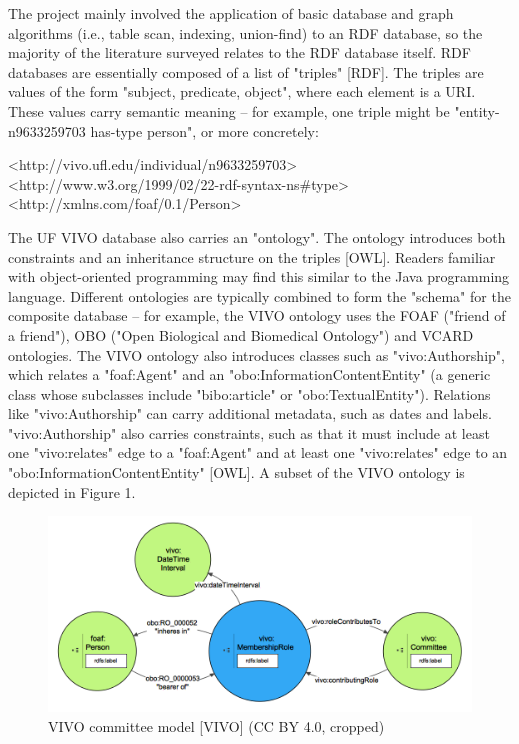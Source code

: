 \documentclass[11pt]{article}
\begin{document}
The project mainly involved the application of basic database and graph algorithms (i.e., table scan, indexing, union-find) to an RDF database, so the majority of the literature surveyed relates to the RDF database itself. RDF databases are essentially composed of a list of "triples" [RDF]. The triples are values of the form "subject, predicate, object", where each element is a URI. These values carry semantic meaning -- for example, one triple might be "entity-n9633259703 has-type person", or more concretely:

<http://vivo.ufl.edu/individual/n9633259703> <http://www.w3.org/1999/02/22-rdf-syntax-ns\#type> <http://xmlns.com/foaf/0.1/Person>

The UF VIVO database also carries an "ontology". The ontology introduces both constraints and an inheritance structure on the triples [OWL]. Readers familiar with object-oriented programming may find this similar to the Java programming language. Different ontologies are typically combined to form the "schema" for the composite database -- for example, the VIVO ontology uses the FOAF ("friend of a friend"), OBO ("Open Biological and Biomedical Ontology") and VCARD ontologies. The VIVO ontology also introduces classes such as "vivo:Authorship", which relates a "foaf:Agent" and an "obo:InformationContentEntity" (a generic class whose subclasses include "bibo:article" or "obo:TextualEntity"). Relations like "vivo:Authorship" can carry additional metadata, such as dates and labels. "vivo:Authorship" also carries constraints, such as that it must include at least one "vivo:relates" edge to a "foaf:Agent" and at least one "vivo:relates" edge to an "obo:InformationContentEntity" [OWL]. A subset of the VIVO ontology is depicted in Figure 1.

\begin{figure}[h!]
\centering
\includegraphics[width=\textwidth]{membership-model.png}
\caption{VIVO committee model [VIVO] (CC BY 4.0, cropped)}
\label{fig:output}
\end{figure}
\end{document}

